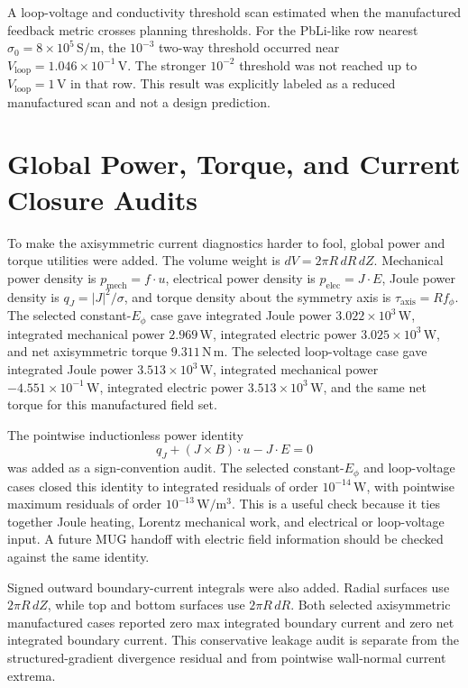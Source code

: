 \documentclass[11pt]{article}
\begin{document}
A loop-voltage and conductivity threshold scan estimated when the manufactured feedback metric crosses planning thresholds. For the PbLi-like row nearest \(\sigma_0=8\times 10^5\,\mathrm{S/m}\), the \(10^{-3}\) two-way threshold occurred near \(V_{\mathrm{loop}}=1.046\times 10^{-1}\,\mathrm{V}\). The stronger \(10^{-2}\) threshold was not reached up to \(V_{\mathrm{loop}}=1\,\mathrm{V}\) in that row. This result was explicitly labeled as a reduced manufactured scan and not a design prediction.

\section{Global Power, Torque, and Current Closure Audits}

To make the axisymmetric current diagnostics harder to fool, global power and torque utilities were added. The volume weight is \(dV=2\pi R\,dR\,dZ\). Mechanical power density is \(p_{\mathrm{mech}} = f\cdot u\), electrical power density is \(p_{\mathrm{elec}}=J\cdot E\), Joule power density is \(q_J=|J|^2/\sigma\), and torque density about the symmetry axis is \(\tau_{\mathrm{axis}} = R f_\phi\). The selected constant-\(E_\phi\) case gave integrated Joule power \(3.022\times 10^3\,\mathrm{W}\), integrated mechanical power \(2.969\,\mathrm{W}\), integrated electric power \(3.025\times 10^3\,\mathrm{W}\), and net axisymmetric torque \(9.311\,\mathrm{N\,m}\). The selected loop-voltage case gave integrated Joule power \(3.513\times 10^3\,\mathrm{W}\), integrated mechanical power \(-4.551\times 10^{-1}\,\mathrm{W}\), integrated electric power \(3.513\times 10^3\,\mathrm{W}\), and the same net torque for this manufactured field set.

The pointwise inductionless power identity
\[
q_J + (J\times B)\cdot u - J\cdot E = 0
\]
was added as a sign-convention audit. The selected constant-\(E_\phi\) and loop-voltage cases closed this identity to integrated residuals of order \(10^{-14}\,\mathrm{W}\), with pointwise maximum residuals of order \(10^{-13}\,\mathrm{W/m^3}\). This is a useful check because it ties together Joule heating, Lorentz mechanical work, and electrical or loop-voltage input. A future MUG handoff with electric field information should be checked against the same identity.

Signed outward boundary-current integrals were also added. Radial surfaces use \(2\pi R\,dZ\), while top and bottom surfaces use \(2\pi R\,dR\). Both selected axisymmetric manufactured cases reported zero max integrated boundary current and zero net integrated boundary current. This conservative leakage audit is separate from the structured-gradient divergence residual and from pointwise wall-normal current extrema.
\end{document}
